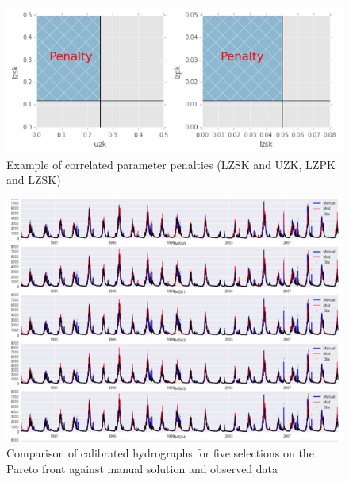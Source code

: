 \documentclass[11pt]{article} %
\begin{document}
\begin{figure}
\centering
\noindent\includegraphics[scale=.7]{./Figures/Joint_Parameter_Penalties.png} 
\caption{Example of correlated parameter penalties (LZSK and UZK, LZPK and LZSK)}
\label{Joint_Penalty}
\end{figure}

\begin{figure}
\centering
\noindent\includegraphics[scale=1]{./Figures/Hydrographs.png} 
\caption{Comparison of calibrated hydrographs for five selections on the Pareto front against manual solution and observed data}
\label{Hydrographs}
\end{figure}
\end{document}
